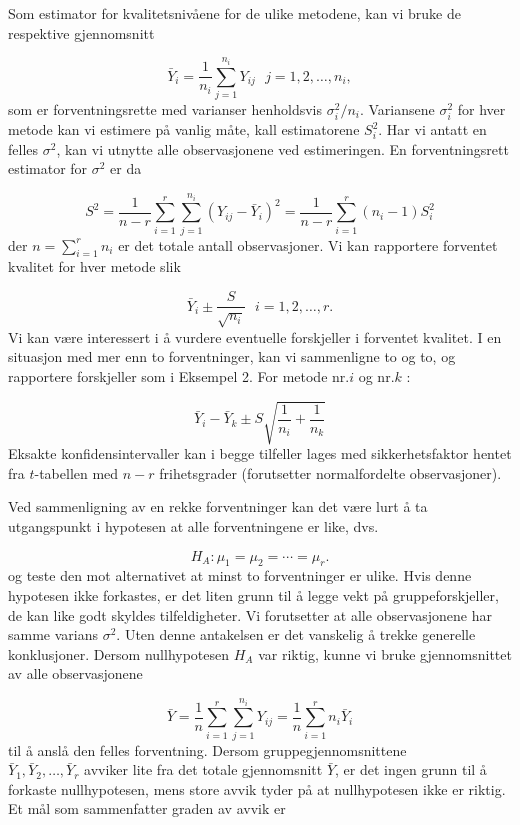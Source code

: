 Som estimator for kvalitetsnivåene for de ulike metodene, kan vi 
bruke de respektive gjennomsnitt

\[   \bar{Y}_i=\frac{1}{n_i}\sum_{j=1}^{n_i}Y_{ij} \mbox{\ \ \ }
                                                 j=1,2,\ldots ,n_i, \]
som er forventningsrette med varianser henholdsvis ${\sigma}_i^2/n_i$.
Variansene ${\sigma}_i^2$ for hver metode kan vi estimere på vanlig
 måte, kall estimatorene $S_i^2$. Har vi antatt en felles ${\sigma}^2$,
kan vi utnytte alle observasjonene ved estimeringen. En forventningsrett
estimator for ${\sigma}^2$ er da

\[ S^2=\frac{1}{n-r}\sum_{i=1}^{r}\sum_{j=1}^{n_i}{(Y_{ij}-\bar{Y}_i)}^2
                                 =\frac{1}{n-r}\sum_{i=1}^{r}(n_i-1)S_i^2 \]
der $n = \sum_{i=1}^r n_i$ er det totale antall observasjoner. Vi kan rapportere
 forventet kvalitet for hver metode slik

\[     \bar{Y}_i \pm \frac{S}{\sqrt{n_i}} \mbox{\ \ \ } i=1,2,\ldots ,r.  \]
Vi kan være interessert i å vurdere eventuelle
forskjeller i forventet kvalitet.  I en situasjon med mer enn to 
forventninger, kan vi sammenligne to og to, og rapportere
forskjeller som i Eksempel 2. For metode nr.$i$ og nr.$k$ :

\[ \bar{Y}_i -\bar{Y}_k\pm S\sqrt{\frac{1}{n_i}+\frac{1}{n_k}} \]
Eksakte konfidensintervaller kan i begge tilfeller lages med sikkerhetsfaktor
hentet fra $t$-tabellen med $n-r$ frihetsgrader (forutsetter normalfordelte
observasjoner).

Ved sammenligning av en rekke forventninger kan det være lurt å
ta utgangspunkt i hypotesen at alle forventningene er like, dvs.

\[    H_A: {\mu}_1 = {\mu}_2 = \cdots = {\mu}_r.   \]
og teste den mot alternativet at minst to forventninger er ulike.
Hvis denne hypotesen ikke forkastes, er det liten grunn til å legge
vekt på gruppeforskjeller, de kan like godt skyldes tilfeldigheter.
Vi forutsetter at alle observasjonene har samme varians  ${\sigma}^2$.
Uten denne antakelsen er det vanskelig å trekke 
generelle konklusjoner.  Dersom nullhypotesen $H_A$ var riktig, kunne
vi bruke gjennomsnittet av alle observasjonene

\[ \bar{Y}=\frac{1}{n}\sum_{i=1}^{r}\sum_{j=1}^{n_i}Y_{ij} =
                \frac{1}{n}\sum_{i=1}^{r}n_i\bar{Y}_i \]
til å anslå den felles forventning.  Dersom gruppegjennomsnittene\\
$\bar{Y}_1, \bar{Y}_2, \ldots, \bar{Y}_r$ avviker lite fra det totale
gjennomsnitt $\bar{Y}$, er det ingen grunn til å forkaste nullhypotesen,
mens store avvik tyder på at nullhypotesen ikke er riktig.  Et mål
som sammenfatter graden av avvik er

